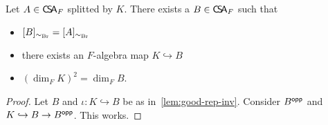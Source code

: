  \begin{corollary}\label{cor:good-rep}
   Let $A\in\operatorname{\mathsf{C}\!\mathsf{S}\!\mathsf{A}}_{F}$ splitted by $K$. There exists a $B \in \operatorname{\mathsf{C}\!\mathsf{S}\!\mathsf{A}}_{F}$ such that
   \begin{itemize}
     \item $[B]_{\sim_{\operatorname{Br}}}=[A]_{\sim_{\operatorname{Br}}}$
     \item there exists an $F$-algebra map $K\hookrightarrow B$
     \item  ${\left(\dim_{F}K\right)}^{2}=\dim_{F}B$.
   \end{itemize}
 \end{corollary}

 \begin{proof}
   Let $B$ and $\iota : K \hookrightarrow B$ be as in~\cref{lem:good-rep-inv}. Consider $B^{\mathsf{opp}}$ and $K \hookrightarrow B \to B^{\mathsf{opp}}$. This works.
 \end{proof}

